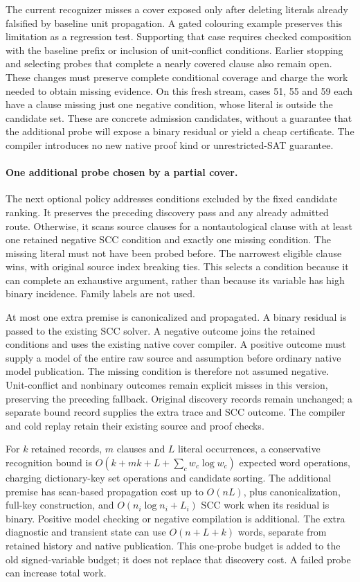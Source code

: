 \documentclass[11pt,a4paper]{article}
\numberwithin{equation}{section}
\theoremstyle{plain}
\theoremstyle{definition}
\theoremstyle{remark}
\begin{document}
The current recognizer misses a cover exposed only after deleting literals
already falsified by baseline unit propagation. A gated colouring example
preserves this limitation as a regression test. Supporting that case requires
checked composition with the baseline prefix or inclusion of unit-conflict
conditions. Earlier stopping and selecting probes that complete a nearly
covered clause also remain open. These changes must preserve complete
conditional coverage and charge the work needed to obtain missing evidence.
On this fresh stream, cases 51, 55 and 59 each have a clause missing just one
negative condition, whose literal is outside the candidate set. These are
concrete admission candidates, without a guarantee that the additional probe
will expose a binary residual or yield a cheap certificate.
The compiler introduces no new native proof kind or unrestricted-SAT guarantee.

\paragraph{One additional probe chosen by a partial cover.}
The next optional policy addresses conditions excluded by the fixed candidate
ranking. It preserves the preceding discovery pass and any already admitted
route. Otherwise, it scans source clauses for a nontautological clause with
at least one retained negative SCC condition and exactly one missing condition.
The missing literal must not have been probed before. The narrowest eligible
clause wins, with original source index breaking ties. This selects a condition
because it can complete an exhaustive argument, rather than because its
variable has high binary incidence. Family labels are not used.

At most one extra premise is canonicalized and propagated. A binary residual
is passed to the existing SCC solver. A negative outcome joins the retained
conditions and uses the existing native cover compiler. A positive outcome
must supply a model of the entire raw source and assumption before ordinary
native model publication. The missing condition is therefore not assumed
negative. Unit-conflict and nonbinary outcomes remain explicit misses in this
version, preserving the preceding fallback. Original discovery records remain
unchanged; a separate bound record supplies the extra trace and SCC outcome.
The compiler and cold replay retain their existing source and proof checks.

For $k$ retained records, $m$ clauses and $L$ literal occurrences, a conservative
recognition bound is $O(k+mk+L+\sum_c w_c\log w_c)$ expected word operations,
charging dictionary-key set operations and candidate sorting. The additional
premise has scan-based propagation cost up to $O(nL)$, plus canonicalization,
full-key construction, and $O(n_i\log n_i+L_i)$ SCC work when its residual is
binary. Positive model checking or negative compilation is additional.
The extra diagnostic and transient state can use $O(n+L+k)$ words, separate
from retained history and native publication. This one-probe budget is added
to the old signed-variable budget; it does not replace that discovery cost.
A failed probe can increase total work.
\end{document}

